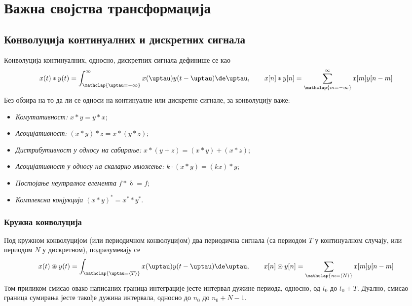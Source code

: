 \renewcommand{\thechapter}{S}
\setcounter{section}{0}
\chapter{Важна својства трансформација} \label{a:svojstva}


\section*{Конволуција континуалних и дискретних сигнала}
Конволуција континуалних, односно, дискретних сигнала дефинише се као 
\begin{equation}
    x(t) \ast y(t) = \int_{\mathclap{\uptau = -\infty}}^{\infty} x(\uptau) y(t-\uptau) \de \uptau, 
    \qquad
    x[n] \ast y[n] = \sum_{\mathclap{m = -\infty}}^{\infty} x[m] y[n-m] 
\end{equation}
Без обзира на то да ли се односи на континуалне или дискретне сигнале, за конволуцију важе:
\begin{itemize}\itemsep0pt
    \item \emph{Комутативност:} $x \ast y = y \ast x$;
    \item \emph{Асоцијативност:} $(x \ast y) \ast z = x \ast (y \ast z)$;
    \item \emph{Дистрибутивност у односу на сабирање:} $x \ast (y + z) = (x \ast y) + (x \ast z)$;
    \item \emph{Асоцијативност у односу на скаларно множење:} $k \cdot (x \ast y) = (kx) \ast y$; 
    \item \emph{Постојање неутралног елемента} $f \ast \updelta = f$; 
    \item \emph{Комплексна конјукција} $(x \ast y)^\ast = x^{\ast} \ast y^{\ast}$.
\end{itemize}

\subsection*{Кружна конволуција}
Под кружном конволуцијом (или периодичном конволуцијом) 
два периодична сигнала (са периодом $T$ у континуалном случају, или 
периодом $N$ у дискретном), подразумевају се 
\begin{equation}
    x(t) \circledast y(t) = \int_{\mathclap{\uptau = \langle T \rangle }} x(\uptau) y(t-\uptau) \de \uptau, 
    \qquad
    x[n] \circledast y[n] = \sum_{\mathclap{m = \langle N \rangle }} x[m] y[n-m] 
\end{equation}
Том приликом смисао овако написаних граница интеграције јесте интервал дужине периода, односно, од $t_0$ до $t_0 + T$. 
Дуално, смисао граница сумирања јесте такође дужина интервала, односно до $n_0$ до $n_0 + N - 1$. 

